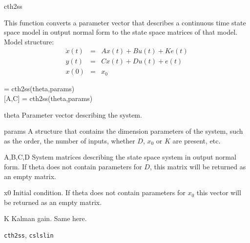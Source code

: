 \documentclass{book}
\newcommand{\cslslin}{\texttt{cslslin}}
\newcommand{\cthtoss}{\texttt{cth2ss}}
\begin{document}
\begin{command}{cth2ss}
  \begin{purpose}
    This function converts a parameter vector that describes a
    continuous time state space model in output normal form to the
    state space matrices of that model.\\  Model structure:
   \begin{eqnarray*}
      \dot{x}(t) &=&  A x(t) + B u(t) +Ke(t)\\
      y(t) &=& C x(t) + Du(t) + e(t)\\
      x(0)&=&x_0
    \end{eqnarray*}
  \end{purpose}
  \begin{syntax}
    [A,B,C,D,x0,K] = cth2ss(theta,params)\\[0pt]
    [A,C] = cth2ss(theta,params)
  \end{syntax}
  \begin{inputs}
  \item[theta] Parameter vector describing the system.  
  \item[params] A structure that contains the dimension parameters of
    the system, such as the order, the number of inputs, whether $D$, $x_0$
    or $K$ are present, etc.
  \end{inputs}
  \begin{outputs} 
  \item[A,B,C,D] System matrices describing the state space system in
    output normal form. If theta does not contain parameters for $D$,
    this matrix will be returned as an empty matrix.
  \item[x0] Initial condition. If theta does not contain parameters
    for $x_0$ this vector will be returned as an empty matrix.
  \item[K] Kalman gain. Same here.
  \end{outputs}
  \begin{seealso}
    {\cthtoss}, {\cslslin}
  \end{seealso}
\end{command}%
 
\end{document}

